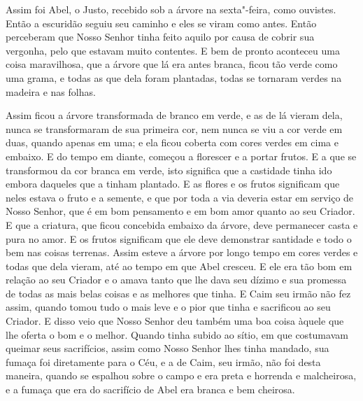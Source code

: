 Assim foi Abel, o Justo, recebido sob a árvore na sexta"-feira, como ouvistes.
Então a escuridão seguiu seu caminho e eles se viram como antes. Então
perceberam que Nosso Senhor tinha feito aquilo por causa de cobrir sua
vergonha, pelo que estavam muito contentes. E bem de pronto aconteceu uma coisa
maravilhosa, que a árvore que lá era antes branca, ficou tão verde como uma
grama, e todas as que dela foram plantadas, todas se tornaram verdes na madeira
e nas folhas.

 Assim ficou a árvore transformada de branco em verde, e as de lá vieram dela,
nunca se transformaram de sua primeira cor, nem nunca se viu a cor verde em
duas, quando apenas em uma; e ela ficou coberta com cores verdes em cima e
embaixo. E do tempo em diante, começou a florescer e a portar frutos. E a que
se transformou da cor branca em verde, isto significa que a castidade tinha ido
embora daqueles que a tinham plantado. E as flores e os frutos significam que
neles estava o fruto e a semente, e que por toda a via deveria estar em serviço
de Nosso Senhor, que é em bom pensamento e em bom amor quanto ao seu Criador. E
que a criatura, que ficou concebida embaixo da árvore, deve permanecer casta e
pura no amor. E os frutos significam que ele deve demonstrar santidade e todo o
bem nas coisas terrenas. Assim esteve a árvore por longo tempo em
cores verdes e todas que dela vieram, até ao tempo em que Abel cresceu. E ele
era tão bom em relação ao seu Criador e o amava tanto que lhe dava seu dízimo e
sua promessa de todas as mais belas coisas e as melhores que tinha. E Caim seu
irmão não fez assim, quando tomou tudo o mais leve e o pior que tinha e
sacrificou ao seu Criador. E disso veio que Nosso Senhor deu também uma boa
coisa àquele que lhe oferta o bom e o melhor. Quando tinha subido ao sítio, em
que costumavam queimar seus sacrifícios, assim como Nosso Senhor lhes tinha
mandado, sua fumaça foi diretamente para o Céu, e a de Caim, seu irmão, não foi
desta maneira, quando se espalhou sobre o campo e era preta e horrenda e malcheirosa,
e a fumaça que era do sacrifício de Abel era branca e bem cheirosa.

